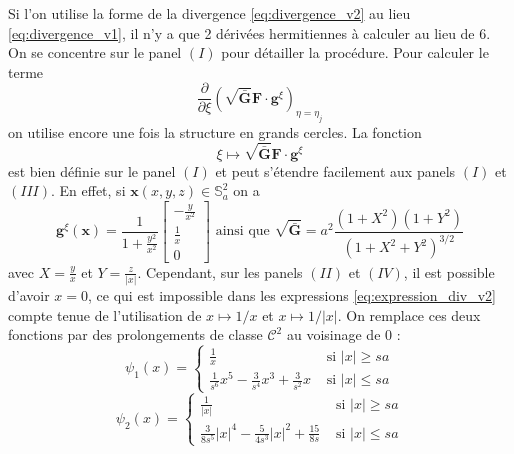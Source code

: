 Si l'on utilise la forme de la divergence \eqref{eq:divergence_v2} au lieu \eqref{eq:divergence_v1}, il n'y a que 2 dérivées hermitiennes à calculer au lieu de 6. 
On se concentre sur le panel $(I)$ pour détailler la procédure. Pour calculer le terme
\begin{equation}
\dfrac{\partial}{\partial \xi} \left( \sqrt{\bar{\mathbf{G}}} \mathbf{F} \cdot \mathbf{g}^{\xi} \right)_{\eta = \eta_j}
\end{equation}
on utilise encore une fois la structure en grands cercles. La fonction
\begin{equation}
\xi \mapsto \sqrt{\bar{\mathbf{G}}} \mathbf{F} \cdot \mathbf{g}^{\xi}
\end{equation}
est bien définie sur le panel $(I)$ et peut s'étendre facilement aux panels $(I)$ et $(III)$. En effet, si $\mathbf{x}(x,y,z) \in \mathbb{S}_a^2$ on a
\begin{equation}
\mathbf{g}^{\xi} (\mathbf{x} ) = \dfrac{1}{1 + \frac{y^2}{x^2}} \begin{bmatrix}
- \frac{y}{x^2} \\
\frac{1}{x} \\
0
\end{bmatrix} \text{ ainsi que } \sqrt{\bar{\mathbf{G}}} = a^2 \dfrac{(1+X^2)(1+Y^2)}{(1+X^2+Y^2)^{3/2}}
\label{eq:expression_div_v2}
\end{equation}
avec $X=\frac{y}{x}$ et $Y = \frac{z}{|x|}$.
Cependant, sur les panels $(II)$ et $(IV)$, il est possible d'avoir $x = 0$, ce qui est impossible dans les expressions \eqref{eq:expression_div_v2} compte tenue de l'utilisation de $x \mapsto 1/x$ et $x \mapsto 1/|x|$.
On remplace ces deux fonctions par des prolongements de classe $\mathcal{C}^2$ au voisinage de $0$ :
\begin{equation}
\psi_1 (x) = \left\lbrace
\begin{array}{ll}
\frac{1}{x} & \text{ si } |x| \geq s a \\
\frac{1}{s^6} x^5 - \frac{3}{s^4} x^3 + \frac{3}{s^2} x & \text{ si } |x| \leq s a
\end{array}
\right.
\end{equation} 
\begin{equation}
\psi_2 (x) = \left\lbrace
\begin{array}{ll}
\frac{1}{|x|} & \text{ si } |x| \geq s a \\
\frac{3}{8s^5} |x|^4 - \frac{5}{4s^3} |x|^2 + \frac{15}{8s} & \text{ si } |x| \leq s a
\end{array}
\right.
\end{equation} 
